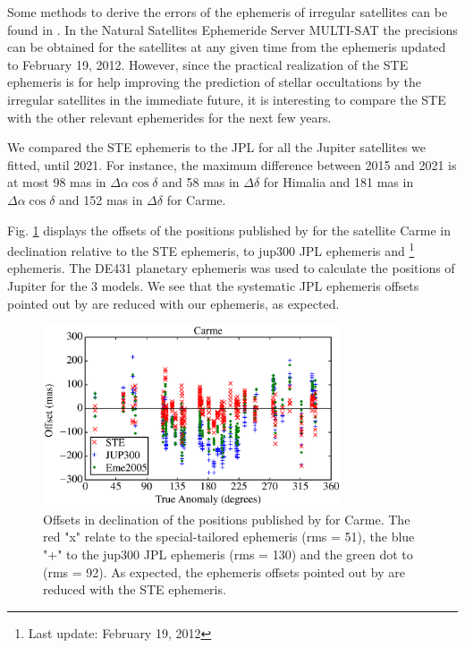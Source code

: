 \documentclass[useAMS,usenatbib]{mn2e}
\begin{document}
Some methods to derive the errors of the ephemeris of irregular satellites can be found in \cite{Emelyanov2010}. In the Natural Satellites Ephemeride Server MULTI-SAT \citep{Emelyanov2008} the precisions can be obtained for the satellites at any given time from the \cite{Emelyanov2005} ephemeris updated to February 19, 2012. However, since the practical realization of the STE ephemeris is for help improving the prediction of stellar occultations by the irregular satellites in the immediate future, it is interesting to compare the STE with the other relevant ephemerides for the next few years.

We compared the STE ephemeris to the JPL for all the Jupiter satellites we fitted, until 2021. For instance, the maximum difference between 2015 and 2021 is at most 98 mas in $\Delta \alpha \cos \delta$ and 58 mas in $\Delta \delta$ for Himalia and 181 mas in $\Delta \alpha \cos \delta$ and 152 mas in $\Delta \delta$ for Carme.

Fig. \ref{Fig: JPL-STE} displays the offsets of the positions published by  for the satellite Carme in declination relative to the STE ephemeris, to \cite{Jacobson2012} jup300 JPL ephemeris and \cite{Emelyanov2005}\footnote{Last update: February 19, 2012} ephemeris. The DE431 planetary ephemeris \citep{Folkner2014} was used to calculate the positions of Jupiter for the 3 models. We see that the systematic JPL ephemeris offsets pointed out by  are reduced with our ephemeris, as expected.

\begin{figure}
\includegraphics[width=8.8cm]{figures/Carme_ephemeris.eps}
\caption{Offsets in declination of the positions published by \protect{} for Carme. The red "x" relate to the special-tailored ephemeris (rms = 51), the blue "+" to the jup300 JPL ephemeris (rms = 130) and the green dot to \protect\cite{Emelyanov2005} (rms = 92). As expected, the ephemeris offsets pointed out by \protect{} are reduced with the STE ephemeris. \label{Fig: JPL-STE}}
\end{figure}
\end{document}

